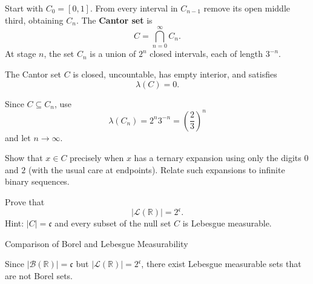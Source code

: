\documentclass[12pt,a4paper]{article}
\begin{document}
\begin{definition}
    Start with $C_0=[0,1]$. From every interval in $C_{n-1}$ remove its open middle third, obtaining $C_n$. The \textbf{Cantor set} is
    \[
        C=\bigcap_{n=0}^{\infty}C_n.
    \]
    At stage $n$, the set $C_n$ is a union of $2^n$ closed intervals, each of length $3^{-n}$.
\end{definition}

\clearpage

\begin{theorem}
    The Cantor set $C$ is closed, uncountable, has empty interior, and satisfies
    \[
        \lambda(C)=0.
    \]
\end{theorem}

\vspace{10pt}

\begin{problem}
    Since $C\subseteq C_n$, use
    \[
        \lambda(C_n)=2^n3^{-n}=\left(\frac{2}{3}\right)^n
    \]
    and let $n\to\infty$.
\end{problem}

\clearpage

\begin{problem}
    Show that $x\in C$ precisely when $x$ has a ternary expansion using only the digits $0$ and $2$ (with the usual care at endpoints). Relate such expansions to infinite binary sequences.
\end{problem}

\clearpage

\begin{problem}
    Prove that
    \[
        |\mathcal{L}(\mathbb{R})|=2^{\mathfrak{c}}.
    \]
    Hint: $|C|=\mathfrak{c}$ and every subset of the null set $C$ is Lebesgue measurable.
\end{problem}

\clearpage

\begin{heading}
    Comparison of Borel and Lebesgue Measurability
\end{heading}

\begin{theorem}
    Since $|\mathcal{B}(\mathbb{R})|=\mathfrak{c}$ but
    $|\mathcal{L}(\mathbb{R})|=2^{\mathfrak{c}}$, there exist Lebesgue measurable sets that are not Borel sets.
\end{theorem}
\end{document}
